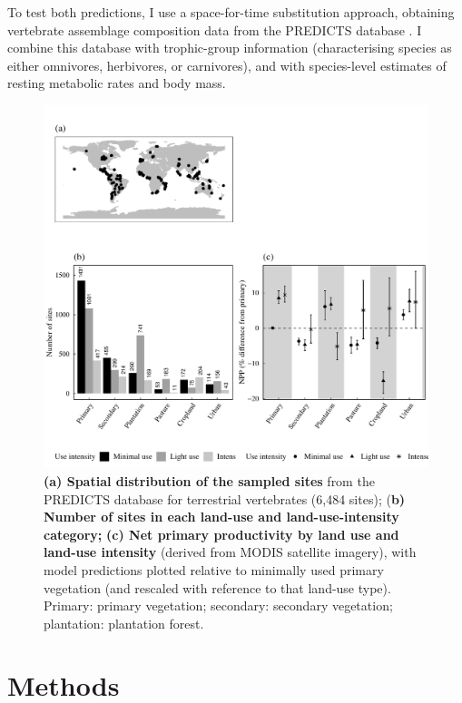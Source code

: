To test both predictions, I use a space-for-time substitution approach, obtaining vertebrate assemblage composition data from the PREDICTS database \citep{Hudson2014, Hudson2017}. I combine this database with trophic-group information (characterising species as either omnivores, herbivores, or carnivores), and with species-level estimates of resting metabolic rates and body mass. 
  
\begin{figure}[h!]
\centering
\includegraphics[scale=0.75]{figures/Chapter5/Figure1}
\caption[Map of PREDICTS sites, sample sizes and NPP by land use and land-use intensity]{\textbf{(a) Spatial distribution of the sampled sites} from the PREDICTS database for terrestrial vertebrates (6,484 sites); (\textbf{b) Number of sites in each land-use and land-use-intensity category;} \textbf{(c) Net primary productivity by land use and land-use intensity} (derived from MODIS satellite imagery), with model predictions plotted relative to minimally used primary vegetation (and rescaled with reference to that land-use type). Primary: primary vegetation; secondary: secondary vegetation; plantation: plantation forest.}
\label{chap5_fig1}
\end{figure}

\section{Methods}

